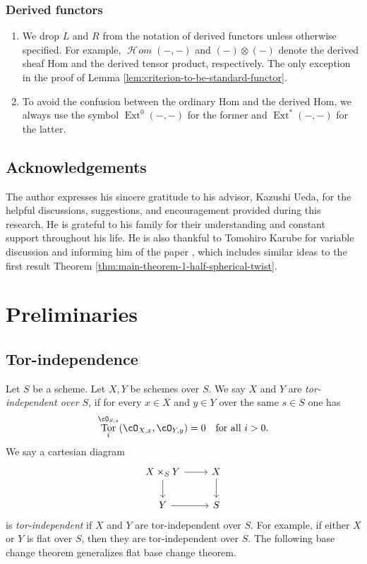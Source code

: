 \documentclass[12pt]{amsart}
\numberwithin{equation}{section}
\theoremstyle{plain}
\theoremstyle{definition}
\DeclareMathOperator{\Tor}{\mathrm{Tor}}
\DeclareMathOperator{\CHom}{\mathcal{H}\!\mathit{om}}
\DeclareMathOperator{\Ext}{\mathrm{Ext}}
\begin{document}
\subsubsection*{Derived functors}
\begin{enumerate}
    \item We drop $L$ and $R$ from the notation of derived functors unless otherwise specified. For example, $\CHom(-, -)$ and $(-)\otimes (-)$ denote the derived sheaf Hom and the derived tensor product, respectively. The only exception in the proof of Lemma \ref{lem:criterion-to-be-standard-functor}.
    \item To avoid the confusion between the ordinary Hom and the derived Hom, we always use the symbol $\Ext^0(-, -)$ for the former and $\Ext^*(-, -)$ for the latter.
\end{enumerate}


\subsection*{Acknowledgements}
The author expresses his sincere gratitude to his advisor, Kazushi Ueda, for the helpful discussions, suggestions, and encouragement provided during this research.
He is grateful to his family for their understanding and constant support throughout his life.
He is also thankful to Tomohiro Karube for variable discussion and informing him of the paper \cite{2023arXiv230109453K}, which includes similar ideas to the first result Theorem \ref{thm:main-theorem-1-half-spherical-twist}.




\section{Preliminaries}\label{section:preliminaries}
\subsection{Tor-independence}
Let $S$ be a scheme.
Let $X, Y$ be schemes over $S$.
We say $X$ and $Y$ are \emph{tor-independent over $S$}, if for every $x \in X$ and $y \in Y$ over the same $s \in S$ one has
\begin{equation}
    \Tor_i^{\cO_{S, s}}(\cO_{X, x}, \cO_{Y, y}) = 0 \quad \text{for all } i > 0.
\end{equation}
We say a cartesian diagram
\[
    \begin{tikzcd}
        X \times_S Y \ar[r] \ar[d] & X \ar[d]\\
        Y \ar[r] & S
    \end{tikzcd}
\]
is \emph{tor-independent} if $X$ and $Y$ are tor-independent over $S$.
For example, if either $X$ or $Y$ is flat over $S$, then they are tor-independent over $S$.
The following base change theorem generalizes flat base change theorem.
\end{document}
